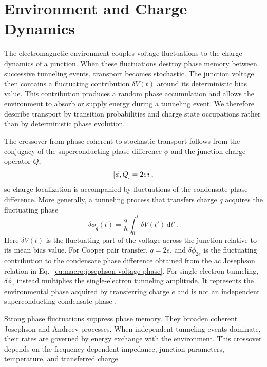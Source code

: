 \newpage
\section{Environment and Charge Dynamics}
\label{sec:stochastic}

    The electromagnetic environment couples voltage fluctuations to the charge dynamics of a junction. When these fluctuations destroy phase memory between successive tunneling events, transport becomes stochastic. The junction voltage then contains a fluctuating contribution $\delta V(t)$ around its deterministic bias value. This contribution produces a random phase accumulation and allows the environment to absorb or supply energy during a tunneling event. We therefore describe transport by transition probabilities and charge state occupations rather than by deterministic phase evolution.

    The crossover from phase coherent to stochastic transport follows from the conjugacy of the superconducting phase difference $\phi$ and the junction charge operator $Q$,
    \begin{equation}
        \left[\phi, Q\right] = 2e\ima\,,
    \end{equation}
    so charge localization is accompanied by fluctuations of the condensate phase difference. More generally, a tunneling process that transfers charge $q$ acquires the fluctuating phase
    \begin{equation}
        \delta \phi_q(t) = \frac{q}{\hbar}\int_0^t \delta V(t')\,\mathrm{d}t'\,.
    \end{equation}
    Here $\delta V(t)$ is the fluctuating part of the voltage across the junction relative to its mean bias value. For Cooper pair transfer, $q=2e$, and $\delta\phi_{2e}$ is the fluctuating contribution to the condensate phase difference obtained from the ac Josephson relation in Eq.~\eqref{eq:macro:josephson-voltage-phase}. For single-electron tunneling, $\delta\phi_e$ instead multiplies the single-electron tunneling amplitude. It represents the environmental phase acquired by transferring charge $e$ and is not an independent superconducting condensate phase \cite{falci_quasiparticle_1991,ingold_charge_1992}.

    Strong phase fluctuations suppress phase memory. They broaden coherent Josephson and Andreev processes. When independent tunneling events dominate, their rates are governed by energy exchange with the environment. This crossover depends on the frequency dependent impedance, junction parameters, temperature, and transferred charge.


